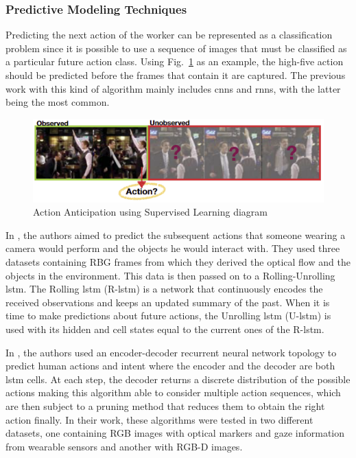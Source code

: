 \subsubsection{Predictive Modeling Techniques}

Predicting the next action of the worker can be represented as a classification problem since it is possible to use a sequence of images that must be classified as a particular future action class. Using Fig.~\ref{superviseddiagram} as an example, the high-five action should be predicted before the frames that contain it are captured. The previous work with this kind of algorithm mainly includes \acp{cnn} and \acp{rnn}, with the latter being the most common.

\begin{figure}[!ht]
\centerline{\includegraphics[width=6in]{figs/superviseddiagram.PNG}}
\caption[Action Anticipation using Supervised Learning diagram]{Action Anticipation using Supervised Learning diagram\cite{Gammulle2019}}
\label{superviseddiagram}
\end{figure}

In \textcite{Furnari2021}, the authors aimed to predict the subsequent actions that someone wearing a camera would perform and the objects he would interact with. They used three datasets containing RBG frames from which they derived the optical flow and the objects in the environment. This data is then passed on to a Rolling-Unrolling \acs{lstm}. The Rolling \acs{lstm} (R-\acs{lstm}) is a network that continuously encodes the received observations and keeps an updated summary of the past. When it is time to make predictions about future actions, the Unrolling \acs{lstm} (U-\acs{lstm}) is used with its hidden and cell states equal to the current ones of the R-\acs{lstm}.

In \textcite{Schydlo2018}, the authors used an encoder-decoder recurrent neural network topology to predict human actions and intent where the encoder and the decoder are both \acs{lstm} cells. At each step, the decoder returns a discrete distribution of the possible actions making this algorithm able to consider multiple action sequences, which are then subject to a pruning method that reduces them to obtain the right action finally. In their work, these algorithms were tested in two different datasets, one containing RGB images with optical markers and gaze information from wearable sensors and another with RGB-D images.

